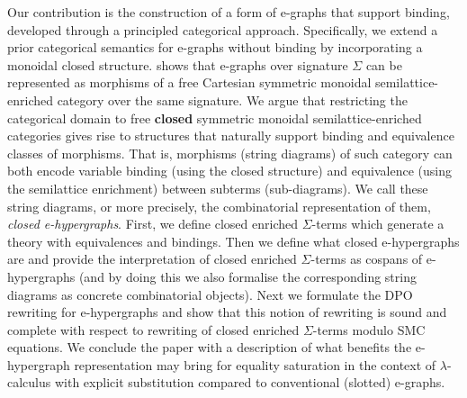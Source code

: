 Our contribution is the construction of a form of e-graphs that support binding, developed through a principled categorical approach.
Specifically, we extend a prior categorical semantics for e-graphs without binding by incorporating a monoidal closed structure.
\citet{tiurin2025equivalencehypergraphsdporewriting} shows that e-graphs over signature $\Sigma$ can be represented as morphisms of a free Cartesian symmetric monoidal semilattice-enriched category over the same signature.
We argue that restricting the categorical domain to free \textbf{closed} symmetric monoidal semilattice-enriched categories gives rise to structures that naturally support binding and equivalence classes of morphisms.
That is, morphisms (string diagrams) of such category can both encode variable binding (using the closed structure) and equivalence (using the semilattice enrichment) between subterms (sub-diagrams).
We call these string diagrams, or more precisely, the combinatorial representation of them, \emph{closed e-hypergraphs}.
First, we define closed enriched $\Sigma$-terms which generate a theory with equivalences and bindings.
Then we define what closed e-hypergraphs are and provide the interpretation of closed enriched $\Sigma$-terms as cospans of e-hypergraphs (and by doing this we also formalise the corresponding string diagrams as concrete combinatorial objects).
Next we formulate the DPO rewriting for e-hypergraphs and show that this notion of rewriting is sound and complete with respect to rewriting of closed enriched $\Sigma$-terms modulo SMC equations.
We conclude the paper with a description of what benefits the e-hypergraph representation may bring for equality saturation in the context of $\lambda$-calculus with explicit substitution compared to conventional (slotted) e-graphs.

